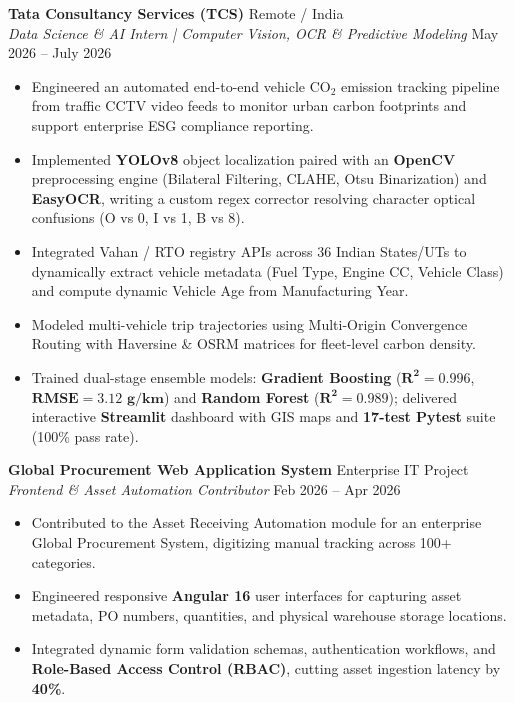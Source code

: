 \documentclass[10pt]{article}
\begin{document}
\textbf{Tata Consultancy Services (TCS)} \hfill Remote / India\\
\textit{Data Science \& AI Intern | Computer Vision, OCR \& Predictive Modeling} \hfill May 2026 -- July 2026
\begin{itemize}[noitemsep, topsep=1pt, partopsep=0pt, parsep=0.5pt]
    \item Engineered an automated end-to-end vehicle $\text{CO}_2$ emission tracking pipeline from traffic CCTV video feeds to monitor urban carbon footprints and support enterprise ESG compliance reporting.
    \item Implemented \textbf{YOLOv8} object localization paired with an \textbf{OpenCV} preprocessing engine (Bilateral Filtering, CLAHE, Otsu Binarization) and \textbf{EasyOCR}, writing a custom regex corrector resolving character optical confusions (O vs 0, I vs 1, B vs 8).
    \item Integrated Vahan / RTO registry APIs across 36 Indian States/UTs to dynamically extract vehicle metadata (Fuel Type, Engine CC, Vehicle Class) and compute dynamic Vehicle Age from Manufacturing Year.
    \item Modeled multi-vehicle trip trajectories using Multi-Origin Convergence Routing with Haversine \& OSRM matrices for fleet-level carbon density.
    \item Trained dual-stage ensemble models: \textbf{Gradient Boosting} ($\mathbf{R^2 = 0.996}$, $\mathbf{\text{RMSE} = 3.12\text{ g/km}}$) and \textbf{Random Forest} ($\mathbf{R^2 = 0.989}$); delivered interactive \textbf{Streamlit} dashboard with GIS maps and \textbf{17-test Pytest} suite (100\% pass rate).
\end{itemize}

\vspace{3pt}

\textbf{Global Procurement Web Application System} \hfill Enterprise IT Project\\
\textit{Frontend \& Asset Automation Contributor} \hfill Feb 2026 -- Apr 2026
\begin{itemize}[noitemsep, topsep=1pt, partopsep=0pt, parsep=0.5pt]
    \item Contributed to the Asset Receiving Automation module for an enterprise Global Procurement System, digitizing manual tracking across 100+ categories.
    \item Engineered responsive \textbf{Angular 16} user interfaces for capturing asset metadata, PO numbers, quantities, and physical warehouse storage locations.
    \item Integrated dynamic form validation schemas, authentication workflows, and \textbf{Role-Based Access Control (RBAC)}, cutting asset ingestion latency by \textbf{40\%}.
\end{itemize}
\end{document}
